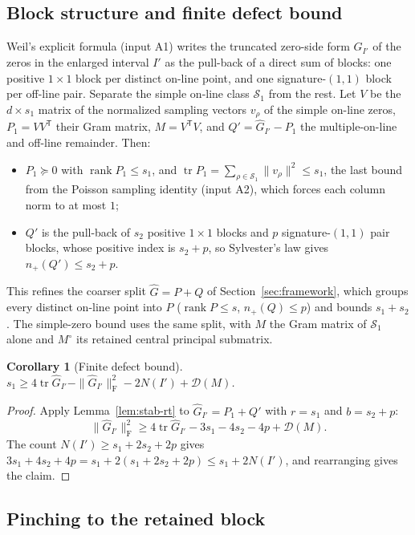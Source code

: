 \documentclass[11pt]{article}
\newtheorem{corollary}[theorem]{Corollary}
\theoremstyle{definition}
\DeclareMathOperator{\tr}{tr}
\DeclareMathOperator{\rank}{rank}
\newcommand{\F}{\mathrm{F}}
\newcommand{\cS}{\mathcal{S}}
\begin{document}
\subsection{Block structure and finite defect bound}

Weil's explicit formula (input A1) writes the truncated zero-side form
$\widehat G_{I'}$ of the zeros in the enlarged interval $I'$ as the pull-back of
a direct sum of blocks: one positive $1\times1$ block per distinct on-line point,
and one signature-$(1,1)$ block per off-line pair. Separate the simple on-line
class $\cS_1$ from the rest. Let $V$ be the $d\times s_1$ matrix of the
normalized sampling vectors $v_\rho$ of the simple on-line zeros,
$P_1=VV^{\mathsf T}$ their Gram matrix, $M=V^{\mathsf T}V$, and
$Q'=\widehat G_{I'}-P_1$ the multiple-on-line and off-line remainder. Then:
\begin{itemize}
\item $P_1\succeq0$ with $\rank P_1\le s_1$, and $\tr P_1=\sum_{\rho\in\cS_1}\|v_\rho\|^2\le s_1$, the last bound from the Poisson sampling identity (input A2), which forces each column norm to at most $1$;
\item $Q'$ is the pull-back of $s_2$ positive $1\times1$ blocks and $p$
signature-$(1,1)$ pair blocks, whose positive index is $s_2+p$, so Sylvester's law
gives $n_+(Q')\le s_2+p$.
\end{itemize}
This refines the coarser split $\widehat G=P+Q$ of Section~\ref{sec:framework},
which groups every distinct on-line point into $P$ ($\rank P\le s$, $n_+(Q)\le p$)
and bounds $s_1+s_2$. The simple-zero bound uses the same split, with $M$ the Gram
matrix of $\cS_1$ alone and $M^\circ$ its retained central principal submatrix.

\begin{corollary}[Finite defect bound]\label{cor:finite-defect}
$s_1\ge4\tr\widehat G_{I'}-\|\widehat G_{I'}\|_{\F}^2-2N(I')+\mathcal D(M)$.
\end{corollary}

\begin{proof}
Apply Lemma~\ref{lem:stab-rt} to $\widehat G_{I'}=P_1+Q'$ with $r=s_1$ and
$b=s_2+p$:
\[
  \|\widehat G_{I'}\|_{\F}^2\ge4\tr\widehat G_{I'}-3s_1-4s_2-4p+\mathcal D(M).
\]
The count $N(I')\ge s_1+2s_2+2p$ gives
$3s_1+4s_2+4p=s_1+2(s_1+2s_2+2p)\le s_1+2N(I')$, and rearranging gives the claim.
\end{proof}

\subsection{Pinching to the retained block}
\end{document}
